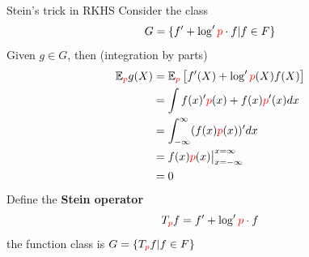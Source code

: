 \begin{frame}
\begin{columns}
\begin{column}{.33\linewidth}
\begin{block}{Stein's trick in RKHS}
Consider the  class \large
$$G = \{ f'  +  \log' { \color{red} p} \cdot  f | f \in F \}$$
\normalsize
Given $g\in G$, then (integration by parts)
\begin{align*}
\mathbb{E}_{\color{red} p} g(X) &=
\mathbb{E}_{\color{red} p} \left[ f'(X)  +  \log' {\color{red} p}(X) f(X) \right] \\
&= \int   f(x)' { \color{red} p}(x)   + f(x){\color{red} p}'(x) dx \\
&= \int_{-\infty}^{\infty} (f(x) {\color{red} p}(x) )'  dx \\
&= f(x) {\color{red} p}(x)  \big|_{x=-\infty}^{x=\infty} \\
&= 0
\end{align*}
Define the {\bf Stein operator}
\[
 T_{\color{red} p}f =  f'  +  \log' { \color{red} p} \cdot  f
\]
the function class is $G = \{ T_{\color{red} p}f | f \in F \}$
\end{block}
\vspace{-0.75cm}


\end{column}
\end{columns}
\end{frame}
